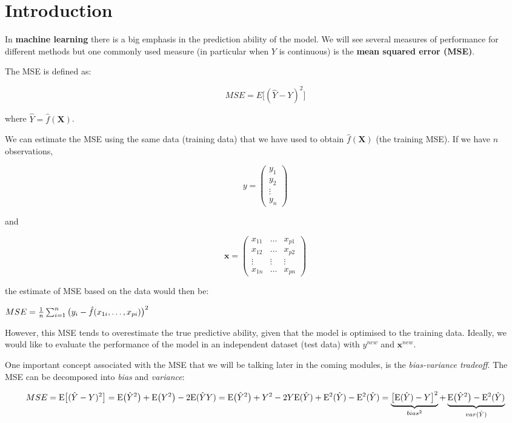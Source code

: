 \documentclass[
]{book}
\begin{document}
\section{Introduction}\label{maccuracy.intro}

In \textbf{machine learning} there is a big emphasis in the prediction ability
of the model. We will see several measures of performance for different methods
but one commonly used measure (in particular when \(Y\) is continuous) is the
\textbf{mean squared error (MSE)}.

The MSE is defined as:

\[
MSE = E \big[ (\hat{Y} - Y)^2 \big]
\]

where \(\hat{Y} = \hat f(\mathbf{X})\).

We can estimate the MSE using the same data (training data)
that we have used to obtain
\(\hat f(\mathbf{X})\) (the training MSE). If we have \(n\) observations,

\[
y=
\begin{pmatrix}
y_1 \\
y_2 \\
\vdots\\
y_n
\end{pmatrix}
\]

and

\[
 \mathbf{x}=
\begin{pmatrix}
x_{11} & \dots & x_{p1} \\
x_{12} & \dots & x_{p2} \\
\vdots & \vdots & \vdots\\
x_{1n} & \dots & x_{pn}
\end{pmatrix}
\]

the estimate of MSE based on the data would then be:

\(MSE = \frac{1}{n} \sum_{i=1}^n \big(y_i - \hat f(x_{1i},\dots, x_{pi})\big)^2\\\)

However, this MSE tends to overestimate the true predictive ability,
given that the model is optimised to the training data. Ideally, we
would like to evaluate the performance of the model
in an independent dataset (test data) with \(y^{new}\) and \(\mathbf{x}^{new}\).

One important concept associated with the MSE that we will be talking later in
the coming modules, is the \emph{bias-variance tradeoff}. The MSE can be decomposed
into \emph{bias} and \emph{variance}:

\begin{equation}
MSE  = \mathrm{E} \big[ (\hat{Y} - Y)^2 \big] \\
 =\mathrm{E} \big(\hat{Y}^2\big) + \mathrm{E}\big(Y^2\big) - 2\mathrm{E}(\hat{Y}Y) \\  = \mathrm{E} \big(\hat{Y}^2\big) + Y^2 - 2Y\mathrm{E}(\hat{Y}) + \mathrm{E}^2(\hat{Y}) - \mathrm{E}^2(\hat{Y})\\
 =\underbrace{ \big[\mathrm{E}(\hat{Y}) - Y \big]^2}_{bias^2} + \underbrace{\mathrm{E} \big(\hat{Y}^2\big) - \mathrm{E}^2(\hat{Y})}_{var(\hat{Y})}
\end{equation}
\end{document}

